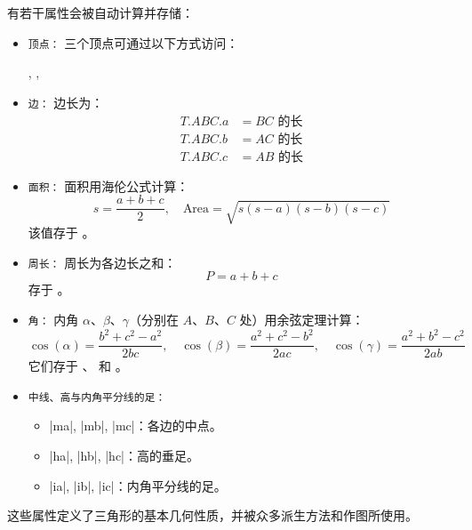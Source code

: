 有若干属性会被自动计算并存储：

\begin{itemize}
  \item \texttt{顶点：} 三个顶点可通过以下方式访问：
  \begin{center}
    , , 
  \end{center}

  \item \texttt{边：} 边长为：
  \begin{align*}
    T.ABC.a &= \text{$BC$ 的长} \\
    T.ABC.b &= \text{$AC$ 的长} \\
    T.ABC.c &= \text{$AB$ 的长}
  \end{align*}

  \item \texttt{面积：} 面积用海伦公式计算：
  \[
    s = \frac{a + b + c}{2}, \quad \text{Area} = \sqrt{s(s - a)(s - b)(s - c)}
  \]
  该值存于 。

  \item \texttt{周长：} 周长为各边长之和：
  \[
    P = a + b + c
  \]
  存于 。

  \item \texttt{角：} 内角 $\alpha$、$\beta$、$\gamma$（分别在 $A$、$B$、$C$ 处）用余弦定理计算：
  \[
  \cos(\alpha) = \frac{b^2 + c^2 - a^2}{2bc}, \quad
  \cos(\beta) = \frac{a^2 + c^2 - b^2}{2ac}, \quad
  \cos(\gamma) = \frac{a^2 + b^2 - c^2}{2ab}
  \]
  它们存于 、 和 。

  \item \texttt{中线、高与内角平分线的足：}
  \begin{itemize}
    \item |ma|, |mb|, |mc|：各边的中点。
    \item |ha|, |hb|, |hc|：高的垂足。
    \item |ia|, |ib|, |ic|：内角平分线的足。
  \end{itemize}
\end{itemize}

这些属性定义了三角形的基本几何性质，并被众多派生方法和作图所使用。


